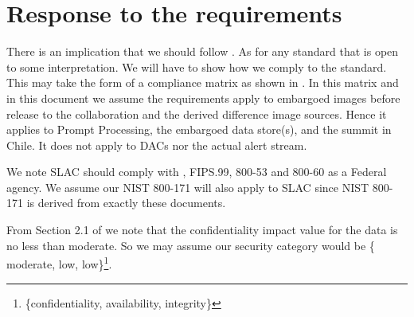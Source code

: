 \section{Response to the requirements}\label{sec:resp}

There is an implication that we should follow . As for any standard that is open to some interpretation.
We will have to show how we comply to the standard.
This may take the form of a compliance matrix as shown in .
In this matrix and in this document we assume the requirements apply to embargoed images before release to the collaboration and the derived difference image sources.
Hence it applies to Prompt Processing, the embargoed data store(s), and the summit in Chile. It does not apply to DACs nor the actual alert stream.

We note SLAC should comply with , FIPS.99, 800-53 and 800-60 as a Federal agency.
We assume our NIST 800-171  will also apply to SLAC since NIST 800-171 is derived from exactly these documents.

From Section 2.1 of  we note that the confidentiality impact value for the data  is no less than moderate.
So we may assume our  security category would be \{ moderate, low, low\}\footnote{\{confidentiality, availability, integrity\}}.









